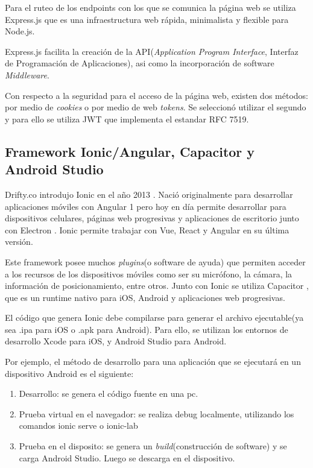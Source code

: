 Para el ruteo de los endpoints con los que se comunica la página web se utiliza Express.js \citep{WEBSITE:21} que es una infraestructura web rápida, minimalista y flexible para Node.js. 

Express.js facilita la creación de la API(\textit{Application Program Interface}, Interfaz de Programación de Aplicaciones), asi como la incorporación de software \textit{Middleware}. 

Con respecto a la seguridad para el acceso de la página web, existen dos métodos: por medio de \textit{cookies} o por medio de web \textit{tokens}. Se seleccionó utilizar el segundo y para ello se utiliza JWT \citep{WEBSITE:22} que implementa el estandar RFC 7519. 



\subsection{Framework Ionic/Angular, Capacitor y Android Studio}
\label{subsec: Ionic}

Drifty.co introdujo Ionic en el año 2013 \citep{WEBSITE:24}. Nació originalmente para desarrollar aplicaciones móviles con Angular 1 pero hoy en día permite desarrollar para dispositivos celulares, páginas web progresivas y aplicaciones de escritorio junto con Electron \citep{WEBSITE:25}. Ionic permite trabajar con Vue, React y Angular en su última versión.

Este framework posee muchos \textit{plugins}(o software de ayuda) que permiten acceder a los recursos de los dispositivos móviles como ser su micrófono, la cámara, la información de posicionamiento, entre otros. Junto con Ionic se utiliza Capacitor \citep{WEBSITE:26}, que es un runtime nativo para iOS, Android y aplicaciones web progresivas.

El código que genera Ionic debe compilarse para generar el archivo ejecutable(ya sea .ipa para iOS o .apk para Android). Para ello, se utilizan los entornos de desarrollo Xcode para iOS, y Android Studio para Android.

Por ejemplo, el método de desarrollo para una aplicación que se ejecutará en un dispositivo Android es el siguiente:

\begin{enumerate}
\item Desarrollo: se genera el código fuente en una pc.
\item Prueba virtual en el navegador:  se realiza debug localmente, utilizando los comandos ionic serve o ionic-lab
\item Prueba en el disposito: se genera un \textit{build}(construcción de software) y se carga Android Studio. Luego se descarga en el dispositivo.
\end{enumerate}
